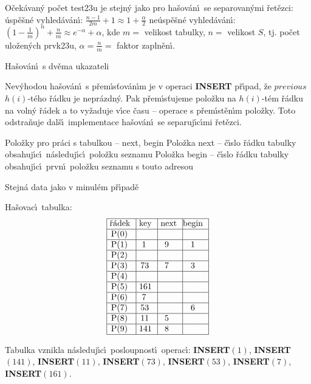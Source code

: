 \documentclass[a4paper,12pt]{article}
\begin{document}
\flushpar O\v cek\'avan\'y po\v cet test\accent23u je stejn\'y jako pro 
ha\v sov\'an\'\i\ se se\-pa\-ro\-va\-n\'y\-mi \v ret\v ezci:\newline 
\phantom{---}\'usp\v e\v sn\'e vyhled\'av\'an\'\i : $\frac {n-1}{
2m}+1\approx 1+\frac {\alpha}2$\newline 
\phantom{---}ne\'usp\v e\v sn\'e vyhled\'av\'an\'\i : $(1-\frac 1
m)^n+\frac nm\approx e^{-\alpha}+\alpha$,\newline 
kde $m=$ velikost tabulky, $n=$ velikost $S$, tj. po\v cet ulo\v zen\'ych 
prvk\accent23u, $\alpha =\frac nm=$ faktor zapln\v en\'\i .

\heading
Ha\v sov\'an\'\i\ s dv\v ema ukazateli
\endheading

\flushpar Nev\'yhodou ha\v sov\'an\'\i\ s p\v rem\'\i s\v tov\'an\'\i m je v operaci 
{\bf INSERT} p\v r\'\i pad, \v ze $previous$ $h(i)$-t\'eho \v r\'adku je nepr\'azdn\'y. Pak p\v rem\'\i s\v tujeme polo\v zku na $h(i)$-t\'em \v r\'adku na voln\'y \v r\'adek a to vy\v zaduje v\'\i ce \v casu -- operace s p\v rem\'\i st\v en\'\i m 
polo\v zky. Toto odstra\v nuje dal\v s\'\i\ implementace ha\v sov\'an\'\i\ se 
separuj\'\i c\'\i mi \v ret\v ezci.
\smallskip

\flushpar Polo\v zky pro pr\'aci s tabulkou -- next, 
begin\newline 
\phantom{---}Polo\v zka next -- \v c\'\i slo \v r\'adku tabulky obsahuj\'\i c\'\i\ 
n\'asleduj\'\i c\'\i\ polo\v z\-ku seznamu\newline 
\phantom{---}Polo\v zka begin -- \v c\'\i slo \v r\'adku tabulky obsahuj\'\i c\'\i\ prvn\'\i\ polo\v zku seznamu 
s touto adresou\newline 

\flushpar Stejn\'a data jako v minul\'em p\v r\'\i pad\v e\newline 

\flushpar Ha\v sovac\'\i\ tabulka:
$$\vtop{\offinterlineskip\halign {\strut\vrule\ # & \vrule\ # & \vrule\ # & \vrule \hfil # \hfil \vrule\cr\noalign{\hrule}\v r\'adek & key & next & begin \hfil \cr\noalign{\hrule}P(0) & & & \hfill \cr\noalign{\hrule}P(1) & 1 & 9 & 1 \cr\noalign{\hrule}P(2) & & & \hfill \cr\noalign{\hrule}P(3) & 73 & 7 & 3 \cr\noalign{\hrule}P(4) & & &\hfill \cr\noalign{\hrule}P(5) & 161 & & \hfill \cr\noalign{\hrule}P(6) & 7 & & \hfill \cr\noalign{\hrule}P(7) & 53 & & 6 \cr\noalign{\hrule}P(8) & 11 & 5 & \hfill \cr\noalign{\hrule}P(9) & 141 & 8 & \hfill \cr\noalign{\hrule}}}$$

\flushpar Tabulka vznikla n\'asleduj\'\i c\'\i\ posloupnost\'\i\ 
operac\'\i :\newline 
{\bf INSERT$(1)$}, {\bf INSERT$(141)$}, {\bf INSERT$(11)$}, {\bf INSERT$
(73)$}, 
{\bf INSERT$(53)$}, {\bf INSERT$(7)$}, {\bf INSERT$(161)$}. 
\medskip
\end{document}
